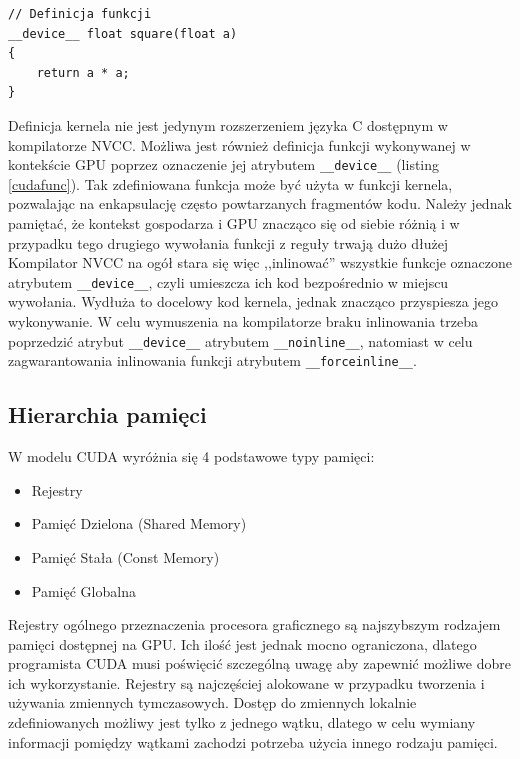 \begin{lstlisting}[caption=Funkcje CUDA, label=cudafunc]
// Definicja funkcji
__device__ float square(float a)
{
	return a * a;
}
\end{lstlisting}

Definicja kernela nie jest jedynym rozszerzeniem języka C dostępnym w
kompilatorze NVCC. Możliwa jest również definicja funkcji wykonywanej w
kontekście GPU poprzez oznaczenie jej atrybutem \texttt{\_\_device\_\_} (listing
		\ref{cudafunc}). Tak zdefiniowana funkcja może być użyta w funkcji
kernela, pozwalając na enkapsulację często powtarzanych fragmentów kodu. Należy
jednak pamiętać, że kontekst gospodarza i GPU znacząco się od siebie różnią i w
przypadku tego drugiego wywołania funkcji z reguły trwają dużo
dłużej\cite{Nvi11b} Kompilator NVCC na ogół stara się więc ,,inlinować'' wszystkie
funkcje oznaczone atrybutem \texttt{\_\_device\_\_}, czyli umieszcza ich kod
bezpośrednio w miejscu wywołania. Wydłuża to docelowy kod kernela, jednak
znacząco przyspiesza jego wykonywanie. W celu wymuszenia na kompilatorze braku
inlinowania trzeba poprzedzić atrybut \texttt{\_\_device\_\_} atrybutem
\texttt{\_\_noinline\_\_}, natomiast w celu zagwarantowania inlinowania funkcji
atrybutem \texttt{\_\_forceinline\_\_}.

\subsection{Hierarchia pamięci}
\label{ssec:mem}

W modelu CUDA wyróżnia się 4 podstawowe typy pamięci:
\begin{itemize}
\item Rejestry
\item Pamięć Dzielona (Shared Memory)
\item Pamięć Stała (Const Memory)
\item Pamięć Globalna
\end{itemize}

Rejestry ogólnego przeznaczenia procesora graficznego są najszybszym rodzajem
pamięci dostępnej na GPU.  Ich ilość jest jednak mocno ograniczona, dlatego
programista CUDA musi poświęcić szczególną uwagę aby zapewnić możliwe dobre ich
wykorzystanie. Rejestry są najczęściej alokowane w przypadku tworzenia i
używania zmiennych tymczasowych. Dostęp do zmiennych lokalnie zdefiniowanych
możliwy jest tylko z jednego wątku, dlatego w celu wymiany informacji pomiędzy
wątkami zachodzi potrzeba użycia innego rodzaju pamięci.

